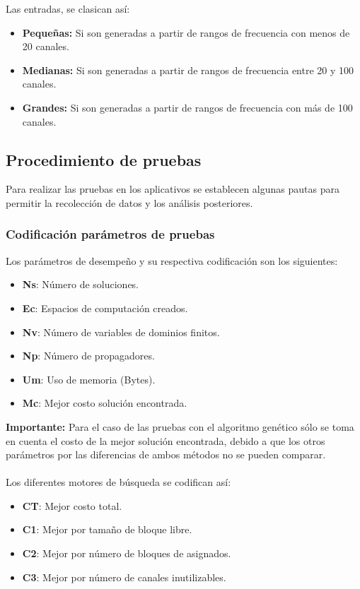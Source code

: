 Las entradas, se clasican así:

\begin{itemize}
	\item \textbf{Pequeñas:} Si son generadas a partir de rangos de frecuencia con menos de 20 canales.
	\item \textbf{Medianas:} Si son generadas a partir de rangos de frecuencia entre 20 y 100 canales.
	\item \textbf{Grandes:} Si son generadas a partir de rangos de frecuencia con más de 100 canales.
\end{itemize}

\subsection{Procedimiento de pruebas}

Para realizar las pruebas en los aplicativos se establecen algunas pautas para permitir la recolección de datos y los análisis posteriores.

\subsubsection{Codificación parámetros de pruebas}

Los parámetros de desempeño y su respectiva codificación son los siguientes:

\begin{itemize}
	\item \textbf{Ns}: Número de soluciones.
	\item \textbf{Ec}: Espacios de computación creados.
	\item \textbf{Nv}: Número de variables de dominios finitos.
	\item \textbf{Np}: Número de propagadores.
	\item \textbf{Um}: Uso de memoria (Bytes).
	\item \textbf{Mc}: Mejor costo solución encontrada.
\end{itemize}

\textbf{Importante:} Para el caso de las pruebas con el algoritmo genético sólo se toma en cuenta el costo de la mejor solución encontrada, debido a que los otros parámetros por las diferencias de ambos métodos no se pueden comparar.
\\\\
Los diferentes motores de búsqueda se codifican así:

\begin{itemize}
	\item \textbf{CT}: Mejor costo total.
	\item \textbf{C1}: Mejor por tamaño de bloque libre.
	\item \textbf{C2}: Mejor por número de bloques de asignados.
	\item \textbf{C3}: Mejor por número de canales inutilizables.
\end{itemize}

